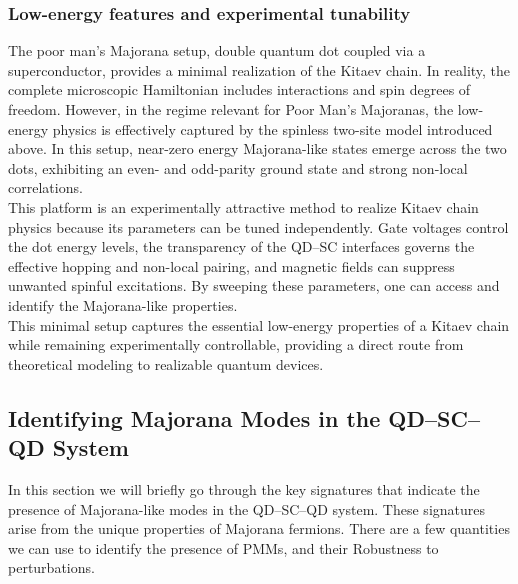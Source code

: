 \documentclass[11pt, letterpaper, titlepage]{article}
\begin{document}
\subsubsection{Low-energy features and experimental tunability}
The poor man's Majorana setup, double quantum dot coupled via a superconductor, provides a minimal realization of the Kitaev chain. In reality, the complete microscopic Hamiltonian includes interactions and spin degrees of freedom. However, in the regime relevant for Poor Man's Majoranas, the low-energy physics is effectively captured by the spinless two-site model introduced above. In this setup, near-zero energy Majorana-like states emerge across the two dots, exhibiting an even- and odd-parity ground state and strong non-local correlations.\\
This platform is an experimentally attractive method to realize Kitaev chain physics because its parameters can be tuned independently. Gate voltages control the dot energy levels, the transparency of the QD–SC interfaces governs the effective hopping and non-local pairing, and magnetic fields can suppress unwanted spinful excitations. By sweeping these parameters, one can access and identify the  Majorana-like properties. \\
This minimal setup captures the essential low-energy properties of a Kitaev chain while remaining experimentally controllable, providing a direct route from theoretical modeling to realizable quantum devices.
\subsection{Identifying Majorana Modes in the QD–SC–QD System}\label{sec:IdentifyingMajoranaModes}
In this section we will briefly go through the key signatures that indicate the presence of Majorana-like modes in the QD–SC–QD system. These signatures arise from the unique properties of Majorana fermions. There are a few quantities we can use to identify the presence of PMMs, and their Robustness to perturbations.\\
\end{document}
